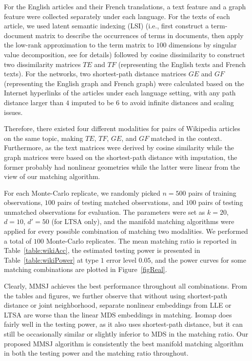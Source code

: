 \documentclass[times,twocolumn,final]{elsarticle}
\begin{document}
For the English articles and their French translations, a text feature and a graph feature were collected separately under each language. For the texts of each article, we used latent semantic indexing (LSI) (i.e., first construct a term-document matrix to describe the occurrences of terms in documents, then apply the low-rank approximation to the term matrix to $100$ dimensions by singular value decomposition, see \citep{DeerwesterDumais1990} for details) followed by cosine dissimilarity to construct two dissimilarity matrices $TE$ and $TF$ (representing the English texts and French texts). For the networks, two shortest-path distance matrices $GE$ and $GF$ (representing the English graph and French graph) were calculated based on the Internet hyperlinks of the articles under each language setting, with any path distance larger than $4$ imputed to be $6$ to avoid infinite distances and scaling issues.

Therefore, there existed four different modalities for pairs of Wikipedia articles on the same topic, making $TE$, $TF$, $GE$, and $GF$ matched in the context. Furthermore, as the text matrices were derived by cosine similarity while the graph matrices were based on the shortest-path distance with imputation, the former probably had nonlinear geometries while the latter were linear from the view of our matching algorithm.

For each Monte-Carlo replicate, we randomly picked $n=500$ pairs of training observations, $100$ pairs of testing matched observations, and $100$ pairs of testing unmatched observations for evaluation. The parameters were set as $k=20$, $d=10$, $d'=50$ (for LTSA only), and the manifold matching algorithms were applied for every possible combination of matching two modalities. We performed a total of $100$ Monte-Carlo replicates. The mean matching ratio is reported in Table~\ref{table:wikiAcc}, the estimated testing power is presented in Table~\ref{table:wikiPower} at type $1$ error level $0.05$, and the power curves for some matching combinations are plotted in Figure~\ref{figReal}. 

Clearly, MMSJ achieves the best performance throughout all combinations. From the tables and figures, we further observe that without using shortest-path distance or joint neighborhood, separate nonlinear embeddings from LLE or LTSA are worse than the linear MDS embeddings in matching. Isomap does fairly well in the testing power, as it also uses shortest-path distance, but it can still be occasionally similar or slightly inferior to MDS in the matching ratio. Our proposed MMSJ algorithm is consistently the best manifold matching algorithm in both the testing power and the matching ratio throughout.
\end{document}
